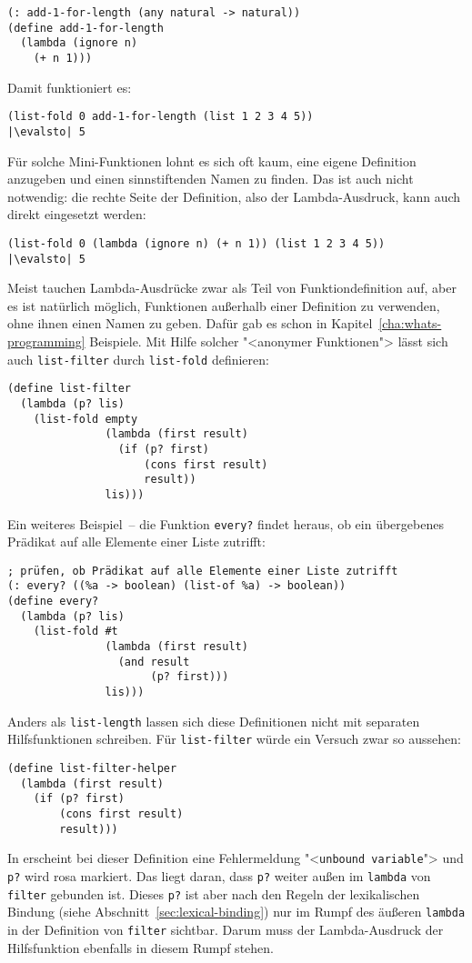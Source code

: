 \begin{lstlisting}
(: add-1-for-length (any natural -> natural))
(define add-1-for-length
  (lambda (ignore n)
    (+ n 1)))
\end{lstlisting}
%
Damit funktioniert es:
%
\begin{lstlisting}
(list-fold 0 add-1-for-length (list 1 2 3 4 5))
|\evalsto| 5
\end{lstlisting}
%
Für solche Mini-Funktionen lohnt es sich oft kaum, eine eigene
Definition anzugeben und einen sinnstiftenden Namen zu finden.  Das
ist auch nicht notwendig: die rechte Seite der Definition, also der
Lambda-Ausdruck, kann auch direkt eingesetzt werden:
%
\begin{lstlisting}
(list-fold 0 (lambda (ignore n) (+ n 1)) (list 1 2 3 4 5))
|\evalsto| 5
\end{lstlisting}
%
Meist tauchen Lambda-Ausdrücke zwar als Teil von Funktiondefinition
auf, aber es ist natürlich möglich, Funktionen außerhalb einer
Definition zu verwenden, ohne ihnen einen Namen zu geben.  Dafür gab
es schon in Kapitel~\ref{cha:whats-programming} Beispiele. Mit Hilfe
solcher "<anonymer Funktionen"> lässt sich auch \texttt{list-filter}
durch \texttt{list-fold} definieren:
%
\begin{lstlisting}
(define list-filter
  (lambda (p? lis)
    (list-fold empty
               (lambda (first result)
                 (if (p? first)
                     (cons first result)
                     result))
               lis)))
\end{lstlisting}
%
Ein weiteres Beispiel~-- die Funktion
\texttt{every?} findet heraus, ob ein
übergebenes Prädikat auf alle Elemente einer Liste zutrifft:
\label{page:every}
%
\begin{lstlisting}
; prüfen, ob Prädikat auf alle Elemente einer Liste zutrifft
(: every? ((%a -> boolean) (list-of %a) -> boolean))
(define every?
  (lambda (p? lis)
    (list-fold #t
               (lambda (first result)
                 (and result
                      (p? first)))
               lis)))
\end{lstlisting}
%
Anders als \texttt{list-length} lassen sich diese Definitionen
nicht mit separaten Hilfsfunktionen schreiben.  Für
\texttt{list-filter} würde ein Versuch zwar so aussehen:
%
\begin{lstlisting}
(define list-filter-helper
  (lambda (first result)
    (if (p? first)
        (cons first result)
        result)))
\end{lstlisting}
%
In \drscheme{} erscheint bei dieser Definition eine Fehlermeldung 
"<\texttt{unbound variable}"> und \texttt{p?} wird rosa markiert.  Das
liegt daran, dass \texttt{p?} weiter außen im \texttt{lambda} von
\texttt{filter} gebunden ist.  Dieses \texttt{p?} ist aber nach den
Regeln der lexikalischen Bindung (siehe
Abschnitt~\ref{sec:lexical-binding}) nur im Rumpf des äußeren
\texttt{lambda} in der Definition von \texttt{filter} sichtbar.  Darum
muss der Lambda-Ausdruck der Hilfsfunktion ebenfalls in diesem
Rumpf stehen.

